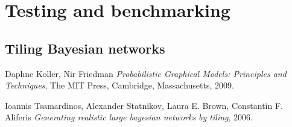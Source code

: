 \documentclass{article}
\begin{document}
\section{Testing and benchmarking}
\subsection{Tiling Bayesian networks \cite{Tsamardinos2006}}

\begin{thebibliography}{9}
	
	Daphne Koller, Nir Friedman
	\emph{Probabilistic Graphical Models: Principles and Techniques},
	The MIT Press, Cambridge, Massachusetts,
	2009.
	
	Ioannis Tsamardinos, Alexander Statnikov, Laura E. Brown, Constantin F. Aliferis
	\emph{Generating realistic large bayesian networks by tiling},
	2006.
	
\end{thebibliography}
\end{document}
